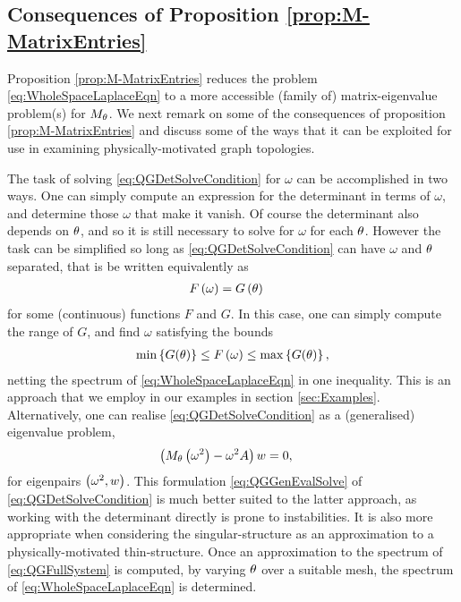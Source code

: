 \subsection{Consequences of Proposition \ref{prop:M-MatrixEntries}} \label{ssec:MMatrixConsequences}
Proposition \ref{prop:M-MatrixEntries} reduces the problem \eqref{eq:WholeSpaceLaplaceEqn} to a more accessible (family of) matrix-eigenvalue problem(s) for $M_\theta$.
We next remark on some of the consequences of proposition \ref{prop:M-MatrixEntries} and discuss some of the ways that it can be exploited for use in examining physically-motivated graph topologies.

The task of solving \eqref{eq:QGDetSolveCondition} for $\omega$ can be accomplished in two ways.
One can simply compute an expression for the determinant in terms of $\omega$, and determine those $\omega$ that make it vanish.
Of course the determinant also depends on $\theta$, and so it is still necessary to solve for $\omega$ for each $\theta$.
However the task can be simplified so long as \eqref{eq:QGDetSolveCondition} can have $\omega$ and $\theta$ separated, that is be written equivalently as
\begin{align*}
	F\left( \omega \right) &= G\left( \theta \right)
\end{align*}
for some (continuous) functions $F$ and $G$.
In this case, one can simply compute the range of $G$, and find $\omega$ satisfying the bounds
\begin{align*}
	\min\left\{ G(\theta) \right\} \leq F\left( \omega \right) \leq \max\left\{ G(\theta) \right\},
\end{align*}
netting the spectrum of \eqref{eq:WholeSpaceLaplaceEqn} in one inequality.
This is an approach that we employ in our examples in section \ref{sec:Examples}.
Alternatively, one can realise \eqref{eq:QGDetSolveCondition} as a (generalised) eigenvalue problem,
\begin{align} \label{eq:QGGenEvalSolve}
	\left(  M_\theta\left( \omega^2 \right)-\omega^2 A  \right)w &= 0,
\end{align}
for eigenpairs $\left( \omega^2, w \right)$.
This formulation \eqref{eq:QGGenEvalSolve} of \eqref{eq:QGDetSolveCondition} is much better suited to the latter approach, as working with the determinant directly is prone to instabilities.
It is also more appropriate when considering the singular-structure as an approximation to a physically-motivated thin-structure.
Once an approximation to the spectrum of \eqref{eq:QGFullSystem} is computed, by varying $\theta$ over a suitable mesh, the spectrum of \eqref{eq:WholeSpaceLaplaceEqn} is determined.

